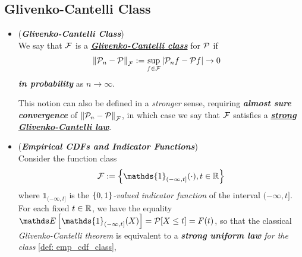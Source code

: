 \documentclass[11pt]{article}
\begin{document}
\subsection{Glivenko-Cantelli Class}
\begin{itemize}
\item \begin{definition} (\textbf{\emph{Glivenko-Cantelli Class}}) \citep{wellner2013weak, wainwright2019high, gine2021mathematical}\\
We say that ${\mathcal F}$ is a \underline{\emph{\textbf{Glivenko-Cantelli class}}} for ${\mathcal P}$ if 
\begin{align*}
\left\|{\mathcal P}_n  - {\mathcal P}\right\|_{{\mathcal F}} &:= \sup_{f \in {\mathcal F}}\left\lvert {\mathcal P}_n f - {\mathcal P} f \right\rvert \to 0
\end{align*}  \emph{\textbf{in probability}} as $n \to \infty$. 

This notion can also be defined in a \emph{stronger} sense, requiring \emph{\textbf{almost sure convergence}} of $\left\|{\mathcal P}_n  - {\mathcal P}\right\|_{{\mathcal F}}$, in which case we say that ${\mathcal F}$ satisfies a \underline{\emph{\textbf{strong Glivenko-Cantelli law}}}.
\end{definition}

\item \begin{example} (\textbf{\emph{Empirical CDFs and Indicator Functions}}) \\
Consider the function class
\begin{align}
\cF := \set{\mathds{1}_{(-\infty, t]}(\cdot), t \in \bR}  \label{def: emp_cdf_class}
\end{align}
where $\mathds{1}_{(-\infty, t]}$ is the \emph{$\left\{0, 1\right\}$-valued indicator function} of the interval $(-\infty, t]$. For each fixed $t \in {\mathbb R}$, we have the equality $ \E{}{\mathds{1}_{(-\infty, t]}(X)} = \cP[X \le t] = F(t)$, so that the classical \emph{Glivenko-Cantelli theorem} is equivalent to a \emph{\textbf{strong uniform law} for the class} \eqref{def: emp_cdf_class},
\end{example}
\end{itemize}
\end{document}
